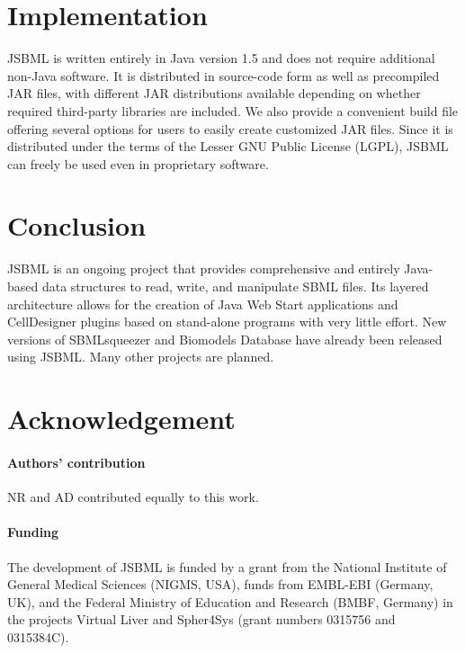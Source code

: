\documentclass{bioinfo}
\begin{document}
\section{Implementation}

JSBML is written entirely in Java version 1.5 and does
not require additional non-Java software.
It is distributed in source-code form as well as precompiled JAR files,
with different JAR distributions available depending on whether required
third-party libraries are included. We also provide a convenient build
file offering several options for users to easily create customized JAR files.
Since it is distributed under the terms of the Lesser GNU Public License (LGPL), 
JSBML can freely be used even in proprietary software.



\section{Conclusion}

JSBML is an ongoing project that provides comprehensive and entirely Java-based
data structures to read, write, and manipulate SBML files. Its layered
architecture allows for the creation of Java Web Start applications and
CellDesigner plugins based on stand-alone programs with very little effort.
%
New versions of SBMLsqueezer \citep{Draeger2008} and Biomodels Database
\citep{Li2010} have  already been released using JSBML. Many other projects are
planned.

\section*{Acknowledgement}

\paragraph{Authors' contribution\textcolon} NR and AD contributed equally to
this work.

\paragraph{Funding\textcolon}
The development of JSBML is funded by a grant from the National Institute of
General Medical Sciences (NIGMS, USA), funds from EMBL-EBI (Germany, UK), and
the Federal Ministry of Education and Research (BMBF, Germany) in the projects
Virtual Liver and Spher4Sys (grant numbers 0315756 and 0315384C).
\end{document}

